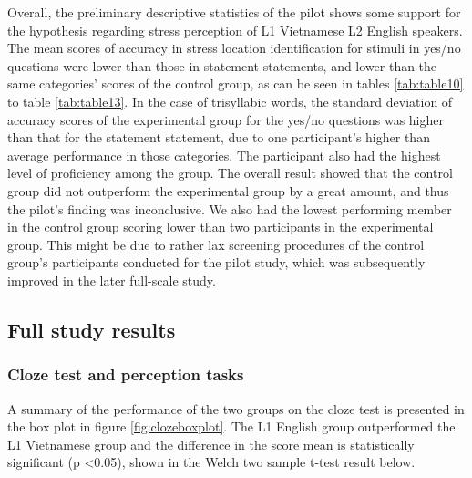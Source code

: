 \documentclass[a4paper]{article}
\begin{document}
Overall, the preliminary descriptive statistics of the pilot shows some support for the hypothesis regarding stress perception of L1 Vietnamese L2 English speakers. The mean scores of accuracy in stress location identification for stimuli in yes/no questions were lower than those in statement statements, and lower than the same categories' scores of the control group, as can be seen in tables \ref{tab:table10} to table \ref{tab:table13}. In the case of trisyllabic words, the standard deviation of accuracy scores of the experimental group for the yes/no questions was higher than that for the statement statement, due to one participant's higher than average performance in those categories. The participant also had the highest level of proficiency among the group. The overall result showed that the control group did not outperform the experimental group by a great amount, and thus the pilot's finding was inconclusive. We also had the lowest performing member in the control group scoring lower than two participants in the experimental group. This might be due to rather lax screening procedures of the control group's participants conducted for the pilot study, which was subsequently improved in the later full-scale study.

\subsection{Full study results}
\subsubsection{Cloze test and perception tasks}
A summary of the performance of the two groups on the cloze test is presented in the box plot in figure \ref{fig:clozeboxplot}. The L1 English group outperformed the L1 Vietnamese group and the difference in the score mean is statistically significant (p \textless 0.05), shown in the Welch two sample t-test result below.



\end{document}
